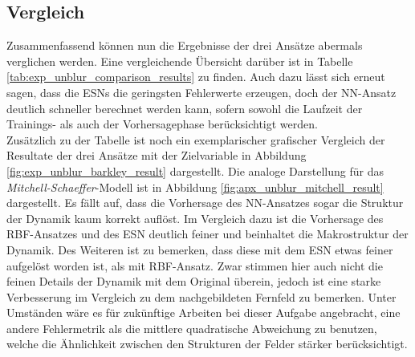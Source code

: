 \FloatBarrier
\subsection{Vergleich}
Zusammenfassend können nun die Ergebnisse der drei Ansätze abermals verglichen werden. Eine vergleichende Übersicht darüber ist in Tabelle \ref{tab:exp_unblur_comparison_results} zu finden. Auch dazu lässt sich erneut sagen, dass die \textsc{ESN}s die geringsten Fehlerwerte erzeugen, doch der \textsc{NN}-Ansatz deutlich schneller berechnet werden kann, sofern sowohl die Laufzeit der Trainings- als auch der Vorhersagephase berücksichtigt werden.\\
Zusätzlich zu der Tabelle ist noch ein exemplarischer grafischer Vergleich der Resultate der drei Ansätze mit der Zielvariable in Abbildung \ref{fig:exp_unblur_barkley_result} dargestellt. Die analoge Darstellung für das \textit{Mitchell-Schaeffer}-Modell ist in Abbildung \ref{fig:apx_unblur_mitchell_result} dargestellt. Es fällt auf, dass die Vorhersage des \textsc{NN}-Ansatzes sogar die Struktur der Dynamik kaum korrekt auflöst. Im Vergleich dazu ist die Vorhersage des \textsc{RBF}-Ansatzes und des \textsc{ESN} deutlich feiner und beinhaltet die Makrostruktur der Dynamik. Des Weiteren ist zu bemerken, dass diese mit dem \textsc{ESN} etwas feiner aufgelöst worden ist, als mit \textsc{RBF}-Ansatz. Zwar stimmen hier auch nicht die feinen Details der Dynamik mit dem Original überein, jedoch ist eine starke Verbesserung im Vergleich zu dem nachgebildeten Fernfeld zu bemerken. Unter Umständen wäre es für zukünftige Arbeiten bei dieser Aufgabe angebracht, eine andere Fehlermetrik als die mittlere quadratische Abweichung zu benutzen, welche die Ähnlichkeit zwischen den Strukturen der Felder stärker berücksichtigt. 

